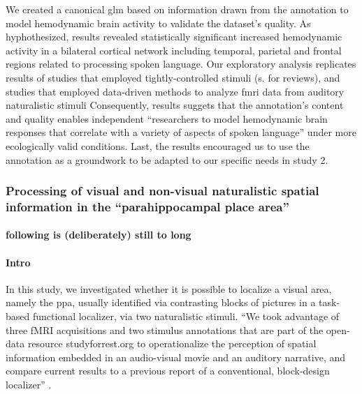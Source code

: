 We created a canonical \ac{glm} based on information drawn from the annotation
to model hemodynamic brain activity to validate the dataset's quality.
As hyphothesized, results revealed statistically significant increased
hemodynamic activity in a bilateral cortical network including temporal,
parietal and frontal regions related to processing spoken language.
Our exploratory analysis replicates results of studies that employed
tightly-controlled stimuli (s. \citep{friederici2011brain,
hickok2007cortical,price2012twentyyears} for reviews), and studies that employed
data-driven methods to analyze \ac{fmri} data from auditory naturalistic stimuli
\citep{honey2012not, lerner2011topographic, silbert2014coupled}
Consequently, results suggets that the annotation's content and quality enables
independent ``researchers to model hemodynamic brain responses that correlate
with a variety of aspects of spoken language'' \citep{haeusler2021speechanno}
under more ecologically valid conditions.
Last, the results encouraged us to use the annotation as a groundwork to be
adapted to our specific needs in study 2.


\subsubsection{Processing of visual and non-visual naturalistic spatial
information in the ``parahippocampal place area''}

\paragraph[inline]{following is (deliberately) still to long}


\paragraph{Intro}

In this study, we investigated whether it is possible to localize a visual area,
namely the \ac{ppa}, usually identified via contrasting blocks of pictures in a
task-based functional localizer, via two naturalistic stimuli.
%
``We took advantage of three fMRI acquisitions and two stimulus annotations that
are part of the open-data resource studyforrest.org to operationalize the
perception of spatial information embedded in an audio-visual movie and an
auditory narrative, and compare current results to a previous report of a
conventional, block-design localizer'' \citep{haeusler2022processing}.

